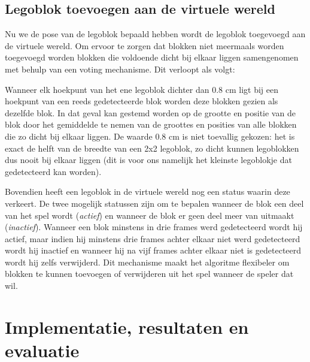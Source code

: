 \subsection{Legoblok toevoegen aan de virtuele wereld} \label{sec:naive_algo_3}

Nu we de pose van de legoblok bepaald hebben wordt de legoblok toegevoegd aan de virtuele wereld. Om ervoor te zorgen dat blokken niet meermaals worden toegevoegd worden blokken die voldoende dicht bij elkaar liggen samengenomen met behulp van een voting mechanisme. Dit verloopt als volgt:

Wanneer elk hoekpunt van het ene legoblok dichter dan 0.8 cm ligt bij een hoekpunt van een reeds gedetecteerde blok worden deze blokken gezien als dezelfde blok. In dat geval kan gestemd worden op de grootte en positie van de blok door het gemiddelde te nemen van de groottes en posities van alle blokken die zo dicht bij elkaar liggen. De waarde 0.8 cm is niet toevallig gekozen: het is exact de helft van de breedte van een 2x2 legoblok, zo dicht kunnen legoblokken dus nooit bij elkaar liggen (dit is voor ons namelijk het kleinste legoblokje dat gedetecteerd kan worden).

Bovendien heeft een legoblok in de virtuele wereld nog een status waarin deze verkeert. De twee mogelijk statussen zijn om te bepalen wanneer de blok een deel van het spel wordt (\textit{actief}) en wanneer de blok er geen deel meer van uitmaakt (\textit{inactief}). Wanneer een blok minstens in drie frames werd gedetecteerd wordt hij actief, maar indien hij minstens drie frames achter elkaar niet werd gedetecteerd wordt hij inactief en wanneer hij na vijf frames achter elkaar niet is gedetecteerd wordt hij zelfs verwijderd. Dit mechanisme maakt het algoritme flexibeler om blokken te kunnen toevoegen of verwijderen uit het spel wanneer de speler dat wil.

\section{Implementatie, resultaten en evaluatie} \label{sec:algo_implreseval}


